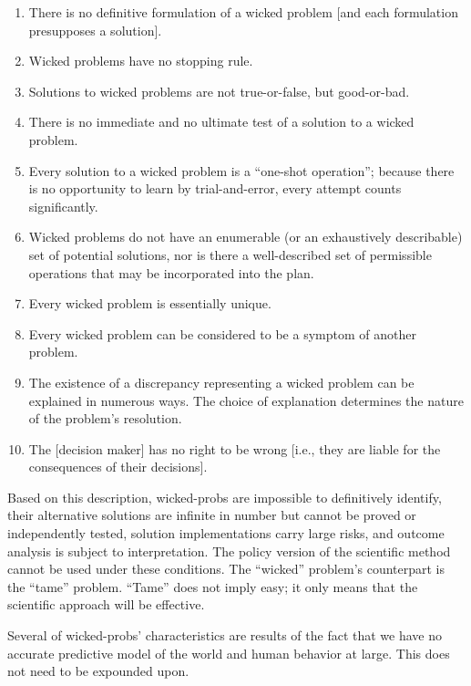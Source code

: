 \begin{displayquote}
  \begin{enumerate}
    \item There is no definitive formulation of a wicked problem [and each formulation presupposes a solution].
    \item Wicked problems have no stopping rule.
    \item Solutions to wicked problems are not true-or-false, but good-or-bad.
    \item There is no immediate and no ultimate test of a solution to a wicked problem.
    \item Every solution to a wicked problem is a ``one-shot operation''; because there is no opportunity to learn by
          trial-and-error, every attempt counts significantly.
    \item Wicked problems do not have an enumerable (or an exhaustively describable) set of potential solutions, nor is
          there a well-described set of permissible operations that may be incorporated into the plan.
    \item Every wicked problem is essentially unique.
    \item Every wicked problem can be considered to be a symptom of another problem.
    \item The existence of a discrepancy representing a wicked problem can be explained in numerous ways. The choice of
          explanation determines the nature of the problem's resolution.
    \item The [decision maker] has no right to be wrong [i.e., they are liable for the consequences of their decisions].
  \end{enumerate}
\end{displayquote}

Based on this description, \acp{wicked-prob} are impossible to definitively identify, their alternative solutions are
infinite in number but cannot be proved or independently tested, solution implementations carry large risks, and outcome
analysis is subject to interpretation. The policy version of the scientific method cannot be used under these
conditions. The ``wicked'' problem's counterpart is the ``tame'' problem. ``Tame'' does not imply easy; it only means
that the scientific approach will be effective.

Several of \acp{wicked-prob}' characteristics are results of the fact that we have no accurate predictive model of the
world and human behavior at large. This does not need to be expounded upon.

